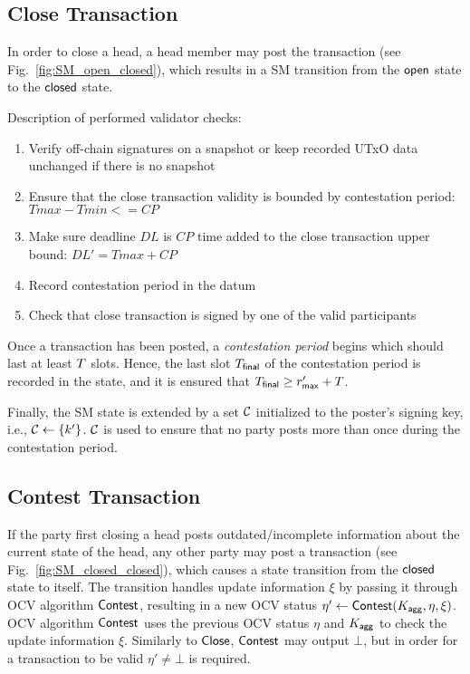 


\subsection{Close Transaction} 

In order to close a head, a head
member may post the \mtxClose{} transaction (see
Fig.~\ref{fig:SM_open_closed}), which results in a SM transition
from the $\mathsf{open}$ state to the $\mathsf{closed}$ state.\newline

Description of performed validator checks:

\begin{enumerate}
  \item Verify off-chain signatures on a snapshot or keep recorded UTxO data unchanged if there is no snapshot 
  \item Ensure that the close transaction validity is bounded by contestation period: $Tmax - Tmin <= CP$  
  \item Make sure deadline $DL$ is $CP$ time added to the close transaction upper bound: $DL' = Tmax + CP$
  \item Record contestation period in the datum 
  \item Check that close transaction is signed by one of the valid participants
\end{enumerate}

Once a \mtxClose{} transaction has been posted, a \emph{contestation period}
begins which should last at least $T$ slots.  Hence, the last slot
$T_{\mathsf{final}}$ of the contestation period is recorded in the state, and it
is ensured that $T_{\mathsf{final}} \geq r_{\mathsf{max}}' + T$.

Finally, the SM state is extended by a set $\mathcal C$
initialized to the poster's signing key, i.e.,
$\mathcal C \gets \{k'\}$.   $\mathcal C$ is used to ensure that no party
posts more than once during the contestation period.





\subsection{Contest Transaction} 

If the party first closing a head posts
outdated/incomplete information about the current state of the head,
any other party may post a \mtxContest{} transaction (see
Fig.~\ref{fig:SM_closed_closed}), which causes a state transition from
the $\mathsf{closed}$ state to itself.  The transition handles update
information $\xi$ by passing it through OCV algorithm $\mathsf{Contest}$,
resulting in a new OCV status
$\eta' \gets \mathsf{Contest} (K_{\mathsf{agg}},\eta,\xi)$.  OCV algorithm
$\mathsf{Contest}$ uses the previous OCV status $\eta$ and $K_{\mathsf{agg}}$ to check
the update information $\xi$.  Similarly to $\mathsf{Close}$, $\mathsf{Contest}$
may output $\bot$, but in order for a \mtxContest{} transaction to be
valid $\eta' \neq \bot$ is required.

